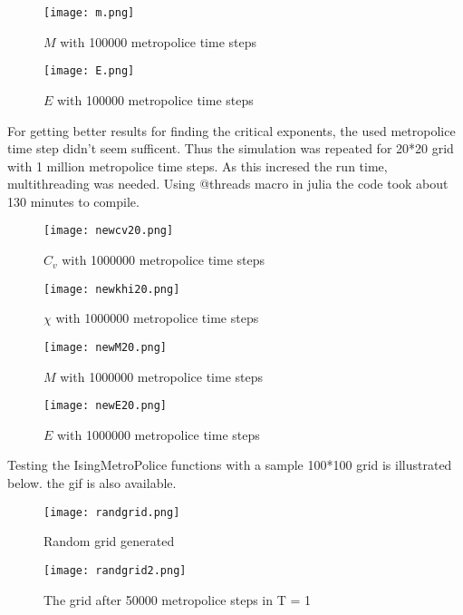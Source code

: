 \documentclass[12pt,a4paper]{article}
\begin{document}
			\begin{figure}[H]
				\centering
				\texttt{[image: m.png]}
				\caption{$M$ with 100000 metropolice time steps}
			\end{figure}

			\begin{figure}[H]
				\centering
				\texttt{[image: E.png]}
				\caption{$E$ with 100000 metropolice time steps}
			\end{figure}
			For getting better results for finding the critical exponents, the used metropolice time step didn't seem sufficent. Thus the simulation was repeated for 20*20 grid with 1 million metropolice time steps.
			As this incresed the run time, multithreading was needed. Using @threads macro in julia the code took about 130 minutes to compile.

			\begin{figure}[H]
				\centering
				\texttt{[image: newcv20.png]}
				\caption{$C_v$ with 1000000 metropolice time steps}
			\end{figure}

			\begin{figure}[H]
				\centering
				\texttt{[image: newkhi20.png]}
				\caption{$\chi$  with 1000000 metropolice time steps}
			\end{figure}


			\begin{figure}[H]
				\centering
				\texttt{[image: newM20.png]}
				\caption{$M$  with 1000000 metropolice time steps}
			\end{figure}

			\begin{figure}[H]
				\centering
				\texttt{[image: newE20.png]}
				\caption{$E$  with 1000000 metropolice time steps}
			\end{figure}
			\pagebreak

			Testing the IsingMetroPolice functions with a sample 100*100 grid is illustrated below. 
			 the gif is also available.

			 \begin{figure}[H]
				\centering
				\texttt{[image: randgrid.png]}
				\caption{Random grid generated}
			\end{figure}

			 \begin{figure}[H]
				\centering
				\texttt{[image: randgrid2.png]}
				\caption{The grid after 50000 metropolice steps in T = 1}
			\end{figure}
\end{document}
